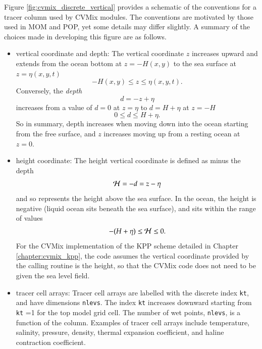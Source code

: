 Figure \ref{fig:cvmix_discrete_vertical} provides a schematic of the
conventions for a tracer column used by CVMix modules. The conventions
are motivated by those used in MOM and POP, yet some details may
differ slightly.  A summary of the choices made in developing this
figure are as follows.
\begin{itemize}

\item {\sc vertical coordinate and depth}: The vertical coordinate $z$ increases
  upward and extends from the ocean bottom at $z=-H(x,y)$ to the sea
  surface at $z = \eta(x,y,t)$
\begin{equation}
   -H(x,y) \le z \le \eta(x,y,t).
\end{equation}
Conversely, the {\it depth} 
\begin{equation}
   d = -z + \eta 
\label{eq:depth-defined}
\end{equation} 
increases from a value of $d=0$ at $z=\eta$ to $d = H+\eta$ at $z=-H$
\begin{equation}
  0 \le   d \le H+\eta. 
\end{equation}
So in summary, depth increases when moving down into the ocean
starting from the free surface, and $z$ increases moving up from a
resting ocean at $z=0$.

\item {\sc height coordinate}: The height vertical coordinate is
  defined as minus the depth
\begin{equation}
   {\cal  H}  = -d = z - \eta 
\label{eq:height-defined}
\end{equation} 
and so represents the height above the sea surface.  In the ocean, the
height is negative (liquid ocean sits beneath the sea surface), and
sits within the range of values
\begin{equation}
  -(H+\eta) \le  {\cal  H}  \le 0.
\end{equation}
For the CVMix implementation of the KPP scheme detailed in Chapter
\ref{chapter:cvmix_kpp}, the code assumes the vertical coordinate
provided by the calling routine is the height, so that the CVMix code
does not need to be given the sea level field.
  
\item {\sc tracer cell arrays}: Tracer cell arrays are labelled with
  the discrete index {\tt kt}, and have dimensions {\tt nlevs}.  The
  index {\tt kt} increases downward starting from {\tt kt} =1 for the
  top model grid cell.  The number of wet points, {\tt nlevs}, is a
  function of the column.  Examples of tracer cell arrays include
  temperature, salinity, pressure, density, thermal expansion
  coefficient, and haline contraction coefficient.


\end{itemize}
